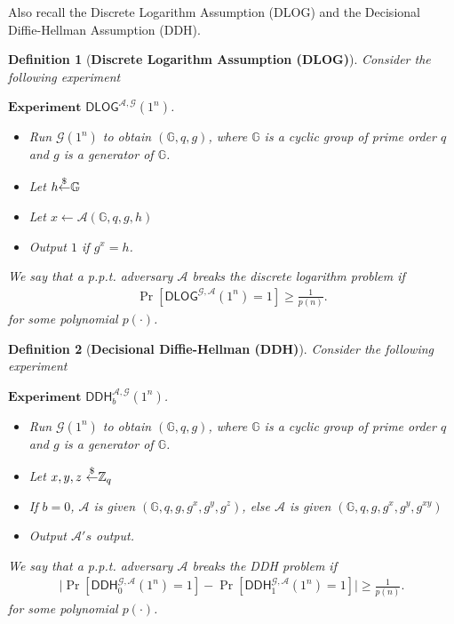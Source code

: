 \documentclass[12pt]{hw}
\newtheorem{definition}{Definition}
\begin{document}
\begin{exercise}
Also recall the Discrete Logarithm Assumption (DLOG) and the Decisional Diffie-Hellman Assumption (DDH).
\begin{definition}[\bf{Discrete Logarithm Assumption (DLOG)}]
    Consider the following experiment
    \begin{mdframed}
        $\textbf{Experiment } \mathsf{DLOG}^{\mathcal{A}, \mathcal{G}}(1^n)$.
        \begin{itemize}
            \item Run $\mathcal{G}(1^n)$ to obtain $(\mathbb{G}, q, g)$, where $\mathbb{G}$ is a cyclic group of prime order $q$  and $g$ is a generator of $\mathbb{G}$.
            \item Let $h {\overset{\$}{\leftarrow}} \mathbb{G}$
            \item Let $x \gets \mathcal{A}(\mathbb{G}, q, g, h)$
            \item Output $1$ if $g^x = h$.
        \end{itemize}
    \end{mdframed}
    We say that a p.p.t. adversary $\mathcal{A}$ breaks the discrete logarithm problem if
    \begin{align*}
        \Pr[\mathsf{DLOG}^{\mathcal{G}, \mathcal{A}}(1^n)=1] \geq \frac{1}{p(n)}.
    \end{align*}
    for some polynomial $p(\cdot)$.
\end{definition}
\begin{definition}[\bf{Decisional Diffie-Hellman (DDH)}]
    Consider the following experiment
    \begin{mdframed}
        $\textbf{Experiment } \mathsf{DDH}_b^{\mathcal{A}, \mathcal{G}}(1^n)$.
        \begin{itemize}
            \item Run $\mathcal{G}(1^n)$ to obtain $(\mathbb{G}, q, g)$, where $\mathbb{G}$ is a cyclic group of prime order $q$  and $g$ is a generator of $\mathbb{G}$.
            \item Let $x, y, z\ {\overset{\$}{\leftarrow}} \mathbb{Z}_q$
            \item If $b = 0$, $\mathcal{A}$ is given $(\mathbb{G}, q, g, g^x, g^y, g^z)$, else $\mathcal{A}$ is given $(\mathbb{G}, q, g, g^x, g^y, g^{xy})$
            \item Output $\mathcal{A}'s$ output.
        \end{itemize}
    \end{mdframed}
We say that a p.p.t. adversary $\mathcal{A}$ breaks the DDH problem if
\begin{align*}
    \vert \Pr[\mathsf{DDH}_0^{\mathcal{G}, \mathcal{A}}(1^n) = 1] - \Pr[\mathsf{DDH}_1^{\mathcal{G}, \mathcal{A}}(1^n) = 1] \vert \geq \frac{1}{p(n)}.
\end{align*}
for some polynomial $p(\cdot)$.
\end{definition}




\end{exercise}
\end{document}

